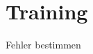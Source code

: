 \documentclass[aspectratio=169,usepdftitle=true]{beamer}
\begin{document}
\section{Training}
\begin{frame}{Fehler bestimmen}
\begin{layout-imageonly}
\begin{columns}[c]
\begin{column}{0.3\linewidth}
\centering
{}

\end{column}\hfill
\begin{column}{0.7\linewidth}
\centering
{}
\end{column}
\end{columns}
\end{layout-imageonly}
\end{frame}
\end{document}
